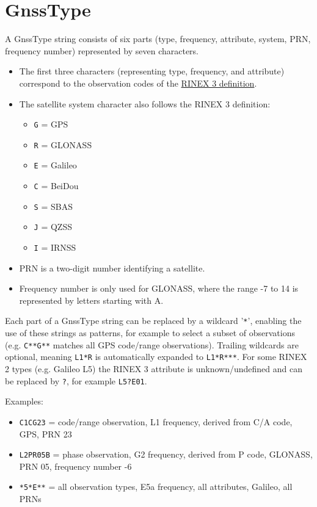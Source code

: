 \section{GnssType}\label{gnssType}
A GnssType string consists of six parts (type, frequency, attribute, system, PRN, frequency number)
represented by seven characters.
\begin{itemize}
\item The first three characters (representing type, frequency, and attribute) correspond to the observation codes of the
      \href{https://files.igs.org/pub/data/format/rinex305.pdf}{RINEX 3 definition}.
\item The satellite system character also follows the RINEX 3 definition:
      \begin{itemize}
        \item \verb|G| = GPS
        \item \verb|R| = GLONASS
        \item \verb|E| = Galileo
        \item \verb|C| = BeiDou
        \item \verb|S| = SBAS
        \item \verb|J| = QZSS
        \item \verb|I| = IRNSS
      \end{itemize}
\item PRN is a two-digit number identifying a satellite.
\item Frequency number is only used for GLONASS, where the range -7 to 14 is represented by letters starting with A.
\end{itemize}

Each part of a GnssType string can be replaced by a wildcard '\verb|*|', enabling the use of these strings as patterns,
for example to select a subset of observations (e.g. \verb|C**G**| matches all GPS code/range observations).
Trailing wildcards are optional, meaning \verb|L1*R| is automatically expanded to \verb|L1*R***|.
For some RINEX 2 types (e.g. Galileo L5) the RINEX 3 attribute is unknown/undefined and can be replaced by \verb|?|,
for example \verb|L5?E01|.

Examples:
\begin{itemize}
\item \verb|C1CG23| = code/range observation, L1 frequency, derived from C/A code, GPS, PRN 23
\item \verb|L2PR05B| = phase observation, G2 frequency, derived from P code, GLONASS, PRN 05, frequency number -6
\item \verb|*5*E**| = all observation types, E5a frequency, all attributes, Galileo, all PRNs
\end{itemize}

